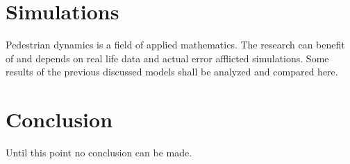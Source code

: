 \newpage
\section{Simulations}
Pedestrian dynamics is a field of applied mathematics. The research can benefit of and depends on real life data and actual error afflicted simulations.
Some results of the previous discussed models shall be analyzed and compared here. 


\newpage
\section{Conclusion}
Until this point no conclusion can be made.

\cite*{kirchner2003friction}





